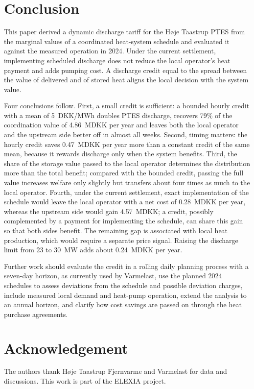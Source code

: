 \section{Conclusion}
\label{sec:conclusion}

This paper derived a dynamic discharge tariff for the Høje Taastrup PTES from the marginal values of a coordinated heat-system schedule and evaluated it against the measured operation in 2024. Under the current settlement, implementing scheduled discharge does not reduce the local operator's heat payment and adds pumping cost. A discharge credit equal to the spread between the value of delivered and of stored heat aligns the local decision with the system value.

Four conclusions follow. First, a small credit is sufficient: a bounded hourly credit with a mean of 5~DKK/MWh doubles PTES discharge, recovers 79\% of the coordination value of 4.86~MDKK per year and leaves both the local operator and the upstream side better off in almost all weeks. Second, timing matters: the hourly credit saves 0.47~MDKK per year more than a constant credit of the same mean, because it rewards discharge only when the system benefits. Third, the share of the storage value passed to the local operator determines the distribution more than the total benefit; compared with the bounded credit, passing the full value increases welfare only slightly but transfers about four times as much to the local operator. Fourth, under the current settlement, exact implementation of the schedule would leave the local operator with a net cost of 0.28~MDKK per year, whereas the upstream side would gain 4.57~MDKK; a credit, possibly complemented by a payment for implementing the schedule, can share this gain so that both sides benefit. The remaining gap is associated with local heat production, which would require a separate price signal. Raising the discharge limit from 23 to 30~MW adds about 0.24~MDKK per year.

Further work should evaluate the credit in a rolling daily planning process with a seven-day horizon, as currently used by Varmelast, use the planned 2024 schedules to assess deviations from the schedule and possible deviation charges, include measured local demand and heat-pump operation, extend the analysis to an annual horizon, and clarify how cost savings are passed on through the heat purchase agreements.

\section*{Acknowledgement}

The authors thank Høje Taastrup Fjernvarme and Varmelast for data and discussions. This work is part of the ELEXIA project.
